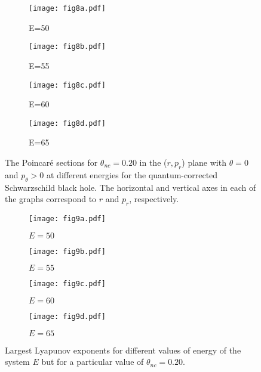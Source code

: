 \documentclass[aps,prd,showpacs,nofootinbib,floats,floatfix,preprintnumbers,groupedaddress,twocolumn]{revtex4-1}
\begin{document}
%
%
\begin{figure}[H]
	\centering
	\begin{subfigure}[b]{0.4\linewidth}
		\texttt{[image: fig8a.pdf]}
		\caption{E=50}
	\end{subfigure}
	\begin{subfigure}[b]{0.4\linewidth}
		\texttt{[image: fig8b.pdf]}
		\caption{E=55}
	\end{subfigure}
	\begin{subfigure}[b]{0.4\linewidth}
		\texttt{[image: fig8c.pdf]}
		\caption{E=60}
	\end{subfigure}
	\begin{subfigure}[b]{0.4\linewidth}
		\texttt{[image: fig8d.pdf]}
		\caption{E=65}
	\end{subfigure}
	\caption{The Poincar\'e sections for $\theta_{nc} = 0.20$ in the ($r,p_r$) plane with $\theta = 0$ and $p_\theta > 0$ at different energies for the quantum-corrected Schwarzschild black hole. The horizontal and vertical axes in each of the graphs correspond to $r$ and $p_r$, respectively.}
	\label{fig:8}
\end{figure}
%
%
%
%
\begin{figure}[hbt!]
	\centering
	\begin{subfigure}[b]{0.6\linewidth}
		\texttt{[image: fig9a.pdf]} \caption{$E=50$}
	\end{subfigure}
	\begin{subfigure}[b]{0.6\linewidth}
		\texttt{[image: fig9b.pdf]} \caption{$E=55$}
	\end{subfigure}
	\begin{subfigure}[b]{0.6\linewidth}
		\texttt{[image: fig9c.pdf]} \caption{$E=60$}
	\end{subfigure}
	\begin{subfigure}[b]{0.6\linewidth}
		\texttt{[image: fig9d.pdf]} \caption{$E=65$}
	\end{subfigure}
	\caption{Largest Lyapunov exponents for different values of energy of the system $E$ but for a particular value of $\theta_{nc}=0.20$.}
	\label{fig:9}
\end{figure} 	 
%
%
%
%
\end{document}
